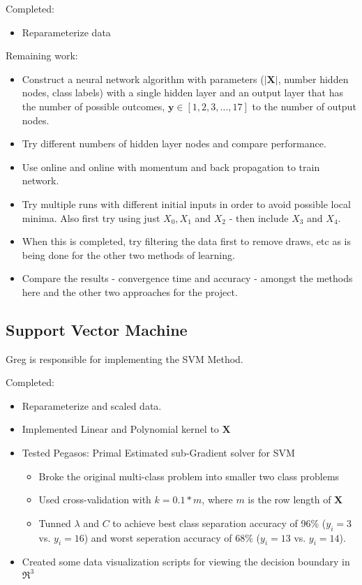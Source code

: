 \documentclass[10pt,fleqn]{article}%
\begin{document}
Completed:
\begin{itemize}
	\item Reparameterize data
\end{itemize}

Remaining work:
\begin{itemize}
	\item Construct a neural network algorithm with parameters ($|\mathbf{X}|$, number hidden nodes, class labels) with a single hidden layer and an output layer that has the number of possible outcomes, $\mathbf{y} \in \left[1,2,3,\dots,17\right]$ to the number of output nodes.
	\item Try different numbers of hidden layer nodes and compare performance.
	\item Use online and online with momentum and back propagation to train network. 
	\item Try multiple runs with different initial inputs in order to avoid possible local minima.  Also first try using just $X_0, X_1$ and $X_2$ - then include $X_3$ and $X_4$.
	\item When this is completed, try filtering the data first to remove draws, etc as is being done for the other two methods of learning.
	\item Compare the results - convergence time and accuracy - amongst the methods here and the other two approaches for the project.
\end{itemize}
%
\subsection{Support Vector Machine}
\label{subsec:Gregory}
Greg is responsible for implementing the SVM Method.

Completed:
\begin{itemize}
	\item Reparameterize and scaled data.
	\item Implemented Linear and Polynomial kernel to $\mathbf{X}$
	\item Tested Pegasos: Primal Estimated sub-Gradient solver for SVM
	\begin{itemize}
		\item Broke the original multi-class problem into smaller two class problems
		\item Used cross-validation with $k = 0.1*m$, where $m$ is the row length of $\mathbf{X}$
		\item Tunned $\lambda$ and $C$ to achieve best class separation accuracy of 96\% ($y_i = 3$ vs. $y_i = 16$) and worst seperation accuracy of 68\% ($y_i = 13$ vs. $y_i = 14$).    
	\end{itemize}
	\item Created some data visualization scripts for viewing the decision boundary in $\Re^3$
\end{itemize}
\end{document}
